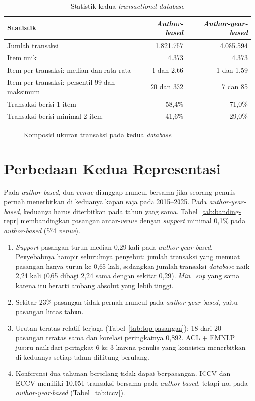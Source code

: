 \begin{table}[!htb]
\caption{Statistik kedua \textit{transactional database}}
\label{tab:statistik-tx}
\small
\begin{tabular*}{\textwidth}{@{\extracolsep{\fill}}@{}lrr@{}}
\toprule
\textbf{Statistik} & \textbf{\textit{Author-based}} & \textbf{\textit{Author-year-based}} \\
\midrule
Jumlah transaksi & 1.821.757 & 4.085.594 \\
Item unik & 4.373 & 4.373 \\
Item per transaksi: median dan rata-rata & 1 dan 2,66 & 1 dan 1,59 \\
Item per transaksi: persentil 99 dan maksimum & 20 dan 332 & 7 dan 85 \\
Transaksi berisi 1 item & 58,4\% & 71,0\% \\
Transaksi berisi minimal 2 item & 41,6\% & 29,0\% \\
\bottomrule
\end{tabular*}
\end{table}

\begin{figure}[!htb]
\centering
{}
\caption{Komposisi ukuran transaksi pada kedua \textit{database}}
\label{fig:komposisi}
\end{figure}

\section{Perbedaan Kedua Representasi}
\label{sec:hasil-banding-repr}
Pada \textit{author-based}, dua \textit{venue} dianggap muncul bersama jika seorang penulis pernah menerbitkan di keduanya kapan saja pada 2015--2025. Pada \textit{author-year-based}, keduanya harus diterbitkan pada tahun yang sama. Tabel~\ref{tab:banding-repr} membandingkan pasangan antar-\textit{venue} dengan \textit{support} minimal 0,1\% pada \textit{author-based} (574 \textit{venue}).
\begin{enumerate}
\item \textit{Support} pasangan turun median 0,29 kali pada \textit{author-year-based}. Penyebabnya hampir seluruhnya penyebut: jumlah transaksi yang memuat pasangan hanya turun ke 0,65 kali, sedangkan jumlah transaksi \textit{database} naik 2,24 kali (0,65 dibagi 2,24 sama dengan sekitar 0,29). \textit{Min\_sup} yang sama karena itu berarti ambang absolut yang lebih tinggi.
\item Sekitar 23\% pasangan tidak pernah muncul pada \textit{author-year-based}, yaitu pasangan lintas tahun.
\item Urutan teratas relatif terjaga (Tabel~\ref{tab:top-pasangan}): 18 dari 20 pasangan teratas sama dan korelasi peringkatnya 0,892. ACL + EMNLP justru naik dari peringkat 6 ke 3 karena penulis yang konsisten menerbitkan di keduanya setiap tahun dihitung berulang.
\item Konferensi dua tahunan berselang tidak dapat berpasangan. ICCV dan ECCV memiliki 10.051 transaksi bersama pada \textit{author-based}, tetapi nol pada \textit{author-year-based} (Tabel~\ref{tab:iccv}).
\end{enumerate}

